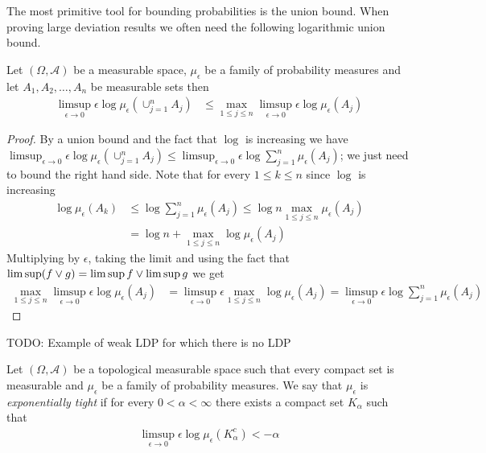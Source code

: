 The most primitive tool for bounding probabilities is the union bound.  When proving large deviation results we often need the following logarithmic union bound.
\begin{prop}\label{LogarithmicUnionBound}Let $(\Omega, \mathcal{A})$ be a measurable space, $\mu_\epsilon$ be a family of probability measures and let $A_1, A_2, \dotsc, A_n$ be measurable sets then 
\begin{align*}
\limsup_{\epsilon \to 0} \epsilon \log \mu_\epsilon( \cup_{j=1}^n A_j) &\leq \max_{1 \leq j\leq n} \limsup_{\epsilon \to 0 } \epsilon \log \mu_\epsilon (A_j)
\end{align*}
\end{prop}
\begin{proof}
By a union bound and the fact that $\log$ is increasing we have $\limsup_{\epsilon \to 0} \epsilon \log \mu_\epsilon( \cup_{j=1}^n A_j)  \leq \limsup_{\epsilon \to 0} \epsilon \log \sum_{j=1}^n\mu_\epsilon( A_j)$; we just need to bound the right hand side.
Note that for every $1 \leq k \leq n$ since $\log$ is increasing
\begin{align*}
\log \mu_\epsilon(A_k) &\leq \log \sum_{j=1}^n \mu_\epsilon(A_j) \leq \log n \max_{1 \leq j \leq n} \mu_\epsilon(A_j) \\
&=\log n + \max_{1 \leq j \leq n} \log \mu_\epsilon(A_j) 
\end{align*}
Multiplying by $\epsilon$, taking the limit and using the fact that $\limsup (f \vee g) = \limsup f \vee \limsup g$ we get 
\begin{align*}
\max_{1 \leq j \leq n}  \limsup_{\epsilon \to 0} \epsilon \log \mu_\epsilon(A_j) &= \limsup_{\epsilon \to 0} \epsilon \max_{1 \leq j \leq n}  \log \mu_\epsilon(A_j) 
= \limsup_{\epsilon \to 0} \epsilon \log \sum_{j=1}^n \mu_\epsilon(A_j)
\end{align*}
\end{proof}


TODO: Example of weak LDP for which there is no LDP 

\begin{defn}Let $(\Omega, \mathcal{A})$ be a topological measurable space such that every compact set is measurable and $\mu_\epsilon$ be a family of probability measures. We say that $\mu_\epsilon$ is \emph{exponentially tight} if for every $0 < \alpha < \infty$ there exists a compact set $K_\alpha$ such that
\begin{align*}
\limsup_{\epsilon \to 0} \epsilon \log \mu_\epsilon(K_\alpha^c) < - \alpha
\end{align*}
\end{defn}